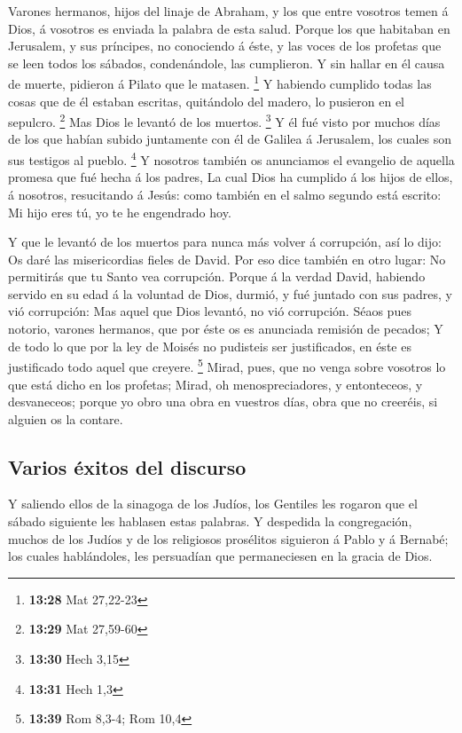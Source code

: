  Varones hermanos, hijos del linaje de Abraham, y los que
entre vosotros temen á Dios, á vosotros es enviada la palabra de esta
salud.  Porque los que habitaban en Jerusalem, y sus
príncipes, no conociendo á éste, y las voces de los profetas que se leen
todos los sábados, condenándole, las cumplieron.  Y sin
hallar en él causa de muerte, pidieron á Pilato que le matasen.
\footnote{\textbf{13:28} Mat 27,22-23}  Y habiendo cumplido
todas las cosas que de él estaban escritas, quitándolo del madero, lo
pusieron en el sepulcro. \footnote{\textbf{13:29} Mat 27,59-60}
 Mas Dios le levantó de los muertos. \footnote{\textbf{13:30}
  Hech 3,15}  Y él fué visto por muchos días de los que
habían subido juntamente con él de Galilea á Jerusalem, los cuales son
sus testigos al pueblo. \footnote{\textbf{13:31} Hech 1,3} 
Y nosotros también os anunciamos el evangelio de aquella promesa que fué
hecha á los padres,  La cual Dios ha cumplido á los hijos
de ellos, á nosotros, resucitando á Jesús: como también en el salmo
segundo está escrito: Mi hijo eres tú, yo te he engendrado hoy.

 Y que le levantó de los muertos para nunca más volver á
corrupción, así lo dijo: Os daré las misericordias fieles de David.
 Por eso dice también en otro lugar: No permitirás que tu
Santo vea corrupción.  Porque á la verdad David, habiendo
servido en su edad á la voluntad de Dios, durmió, y fué juntado con sus
padres, y vió corrupción:  Mas aquel que Dios levantó, no
vió corrupción.  Séaos pues notorio, varones hermanos, que
por éste os es anunciada remisión de pecados;  Y de todo lo
que por la ley de Moisés no pudisteis ser justificados, en éste es
justificado todo aquel que creyere. \footnote{\textbf{13:39} Rom 8,3-4;
  Rom 10,4}  Mirad, pues, que no venga sobre vosotros lo
que está dicho en los profetas;  Mirad, oh
menospreciadores, y entonteceos, y desvaneceos; porque yo obro una obra
en vuestros días, obra que no creeréis, si alguien os la contare.

\hypertarget{varios-uxe9xitos-del-discurso}{%
\subsection{Varios éxitos del
discurso}\label{varios-uxe9xitos-del-discurso}}

 Y saliendo ellos de la sinagoga de los Judíos, los
Gentiles les rogaron que el sábado siguiente les hablasen estas
palabras.  Y despedida la congregación, muchos de los
Judíos y de los religiosos prosélitos siguieron á Pablo y á Bernabé; los
cuales hablándoles, les persuadían que permaneciesen en la gracia de
Dios.

